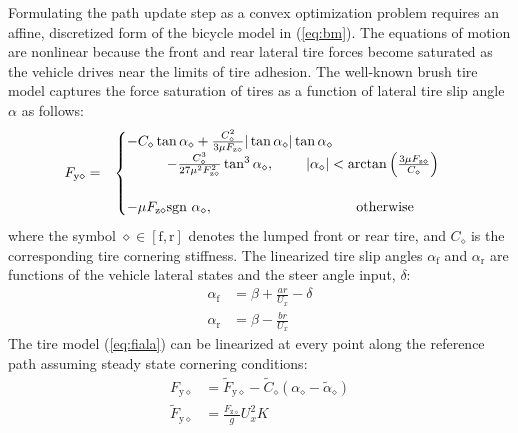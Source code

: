 \documentclass[twocolumn,10pt]{asme2ej}
\begin{document}
Formulating the path update step as a convex optimization problem requires an affine, discretized form of the
bicycle model in (\ref{eq:bm}). The equations of motion are nonlinear because
 the front and rear lateral tire forces become saturated as the vehicle drives near the limits of tire adhesion. 
The well-known brush tire model \cite{Pacejka2012} captures the force saturation of tires as a function of lateral tire slip angle $\alpha$ as follows:
\small
\begin{eqnarray}
\label{eq:fiala}
	F_\mathrm{y\diamond}&=&\begin{cases} -C_{\diamond}\tan\alpha_\diamond + \frac{C_\diamond^2}{3\mu F_\mathrm{z\diamond}} |\tan\alpha_\diamond| \tan\alpha_\diamond \\ \hspace{10mm}- \frac{C_\diamond^3}{27\mu^2F_\mathrm{z\diamond}^2}\tan^3\alpha_\diamond,
\hspace{8mm}  |\alpha_\diamond| < \arctan{\left(\frac{3\mu F_\mathrm{z\diamond}}{C_\diamond}\right)} \\ \\ -\mu F_\mathrm{z\diamond}\text{sgn} \ \alpha_\diamond, \hspace{36mm} \mathrm{otherwise} \end{cases}
\end{eqnarray}
\normalsize
where the symbol $\diamond \in [\mathrm{f},\mathrm{r}]$ denotes the lumped front or rear tire, and $C_\diamond$ is the corresponding tire cornering stiffness. 
The linearized tire slip angles $\alpha_\mathrm{f}$ and $\alpha_\mathrm{r}$ are functions of the vehicle lateral states and the steer angle
input, $\delta$:
\begin{subequations}
\begin{align}
	\alpha_\mathrm{f} &= \beta + \frac{ar}{U_x} - \delta\\
	\alpha_\mathrm{r} &= \beta - \frac{br}{U_x}
\end{align}
\end{subequations}
The tire model (\ref{eq:fiala}) can be linearized at every point along the reference path assuming steady state cornering conditions:
\begin{subequations}
\begin{align}
	F_\mathrm{y\diamond} &= \tilde{F}_\mathrm{y\diamond} - \tilde{C}_\diamond(\alpha_\diamond - \tilde{\alpha}_\diamond) \\
	\tilde{F}_\mathrm{y\diamond} &= \frac{F_\mathrm{z\diamond}}{g} U_x^2K
\label{eqn:ftil}
\end{align}
\end{subequations}
\end{document}
